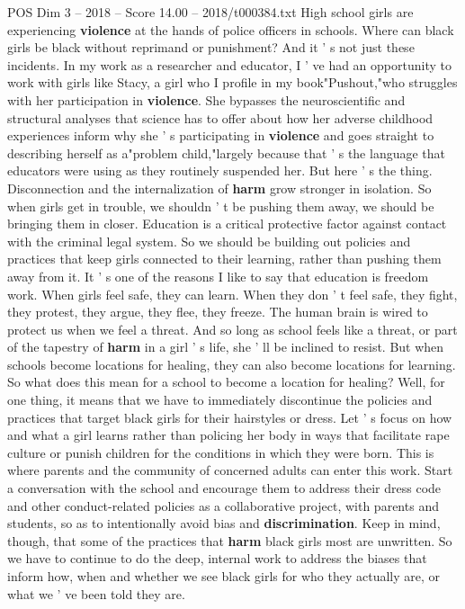 \begin{textsample}{POS Dim 3 – 2018 – Score 14.00 – 2018/t000384.txt}
High school girls are experiencing \textbf{violence} at the hands of police officers in schools.
Where can black girls be black without reprimand or punishment?
And it ' s not just these incidents.
In my work as a researcher and educator, I ' ve had an opportunity to work with girls like Stacy, a girl who I profile in my book"Pushout,"who struggles with her participation in \textbf{violence}.
She bypasses the neuroscientific and structural analyses that science has to offer about how her adverse childhood experiences inform why she ' s participating in \textbf{violence} and goes straight to describing herself as a"problem child,"largely because that ' s the language that educators were using as they routinely suspended her.
But here ' s the thing.
Disconnection and the internalization of \textbf{harm} grow stronger in isolation.
So when girls get in trouble, we shouldn ' t be pushing them away, we should be bringing them in closer.
Education is a critical protective factor against contact with the criminal legal system.
So we should be building out policies and practices that keep girls connected to their learning, rather than pushing them away from it.
It ' s one of the reasons I like to say that education is freedom work.
When girls feel safe, they can learn.
When they don ' t feel safe, they fight, they protest, they argue, they flee, they freeze.
The human brain is wired to protect us when we feel a threat.
And so long as school feels like a threat, or part of the tapestry of \textbf{harm} in a girl ' s life, she ' ll be inclined to resist.
But when schools become locations for healing, they can also become locations for learning.
So what does this mean for a school to become a location for healing?
Well, for one thing, it means that we have to immediately discontinue the policies and practices that target black girls for their hairstyles or dress.
Let ' s focus on how and what a girl learns rather than policing her body in ways that facilitate rape culture or punish children for the conditions in which they were born.
This is where parents and the community of concerned adults can enter this work.
Start a conversation with the school and encourage them to address their dress code and other conduct-related policies as a collaborative project, with parents and students, so as to intentionally avoid bias and \textbf{discrimination}.
Keep in mind, though, that some of the practices that \textbf{harm} black girls most are unwritten.
So we have to continue to do the deep, internal work to address the biases that inform how, when and whether we see black girls for who they actually are, or what we ' ve been told they are.

\end{textsample}
